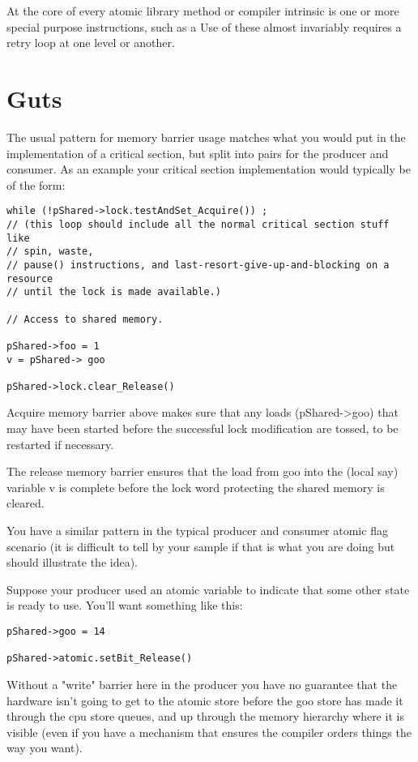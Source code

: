 At the core of every atomic library method or compiler intrinsic is one or more special purpose instructions, such as a 
Use of these almost invariably requires a retry loop at one level or another.

\section{Guts}

The usual pattern for memory barrier usage matches what you would put in the implementation of a critical section, but split into pairs for the producer and consumer. As an example your critical section implementation would typically be of the form:

\begin{lstlisting}
while (!pShared->lock.testAndSet_Acquire()) ;
// (this loop should include all the normal critical section stuff like
// spin, waste, 
// pause() instructions, and last-resort-give-up-and-blocking on a resource 
// until the lock is made available.)

// Access to shared memory.

pShared->foo = 1 
v = pShared-> goo

pShared->lock.clear_Release()
\end{lstlisting}

Acquire memory barrier above makes sure that any loads (pShared->goo) that may have been started before the successful lock modification are tossed, to be restarted if necessary.

The release memory barrier ensures that the load from goo into the (local say) variable v is complete before the lock word protecting the shared memory is cleared.

You have a similar pattern in the typical producer and consumer atomic flag scenario (it is difficult to tell by your sample if that is what you are doing but should illustrate the idea).

Suppose your producer used an atomic variable to indicate that some other state is ready to use. You'll want something like this:

\begin{lstlisting}
pShared->goo = 14

pShared->atomic.setBit_Release()
\end{lstlisting}

Without a "write" barrier here in the producer you have no guarantee that the hardware isn't going to get to the atomic store before the goo store has made it through the cpu store queues, and up through the memory hierarchy where it is visible (even if you have a mechanism that ensures the compiler orders things the way you want).

